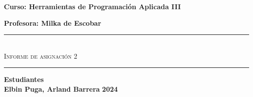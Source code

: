 \begin{titlepage}
\begin{center}
      {\Large \textbf{Curso: Herramientas de Programación Aplicada III}}\medskip
      
      {\Large \textbf{Profesora: Milka de Escobar}}

      \rule{\linewidth}{0.75mm}\\
          {\Large \textsc{Informe de asignación 2}} 
      \rule{\linewidth}{0.75mm}\medskip

      {\Large \textbf{Estudiantes}}\\
      \vspace{5mm}
      {\Large \textbf{Elbin Puga, Arland Barrera}}
      \vfill
      {\Huge \textbf{2024}}

  \end{center}
\end{titlepage}